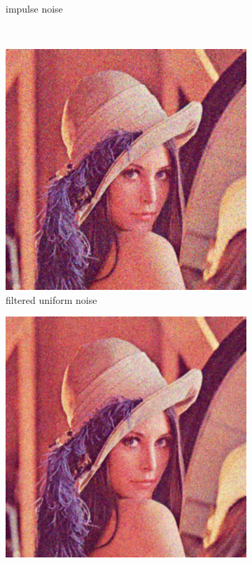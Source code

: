 \documentclass[12pt]{article}
\begin{document}
\begin{figure}[ht]
\begin{subfigure}[t]{\subfiguresize}
        \caption{impulse noise}
    \end{subfigure}\\[2ex]
    \begin{subfigure}[t]{\subfiguresize}
        \includegraphics[width=\textwidth]{lenac_lowpass_uniform_1.png}
        \caption{filtered uniform noise}
    \end{subfigure}
    \begin{subfigure}[t]{\subfiguresize}
        \includegraphics[width=\textwidth]{lenac_lowpass_normal_1.png}

\end{subfigure}
\end{figure}
\end{document}
